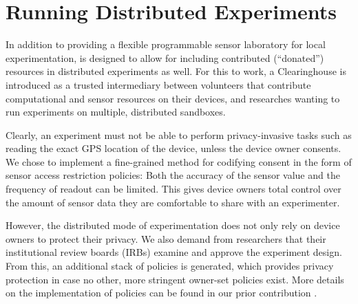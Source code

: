 \section{Running Distributed Experiments}\label{sec:distexp}

In addition to providing a flexible programmable sensor laboratory 
for local experimentation, \sys is designed to allow for including 
contributed (``donated'') resources in distributed experiments as well. 
For this to work, a Clearinghouse is introduced as a trusted 
intermediary between volunteers that contribute computational and 
sensor resources on their devices, and researches wanting to run 
experiments on multiple, distributed sandboxes.

Clearly, an experiment must not be able to perform privacy-invasive 
tasks such as reading the exact GPS location of the device, unless 
the device owner consents. We chose to implement a fine-grained 
method for codifying consent in the form of sensor access restriction 
policies: 
Both the accuracy of the sensor value and the frequency of readout 
can be limited. This gives device owners total control over the 
amount of sensor data they are comfortable to share with an 
experimenter.

However, the distributed mode of experimentation does not only rely on 
device owners to protect their privacy. We also demand from researchers 
that their institutional review boards (IRBs) examine and approve the 
experiment design. From this, an additional stack of policies is generated, 
which provides privacy protection in case no other, more stringent 
owner-set policies exist.
More details on the implementation of policies can be found in our 
prior contribution \cite{zhuang2015privacy}.
